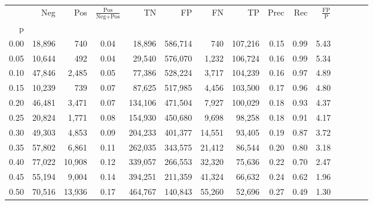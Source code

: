 \begin{tabular}{rrrcrrrrrrrrrrr}
\toprule
{} &     Neg &     Pos & $\frac{\text{Pos}}{\text{Neg}+\text{Pos}}$ &       TN &       FP &       FN &       TP &  Prec &   Rec & $\frac{\text{FP}}{\text{P}}$ \\
p    &         &         &                                            &          &          &          &          &       &       &                              \\
\midrule
0.00 &  18,896 &     740 &                                       0.04 &   18,896 &  586,714 &      740 &  107,216 &  0.15 &  0.99 &                         5.43 \\
0.05 &  10,644 &     492 &                                       0.04 &   29,540 &  576,070 &    1,232 &  106,724 &  0.16 &  0.99 &                         5.34 \\
0.10 &  47,846 &   2,485 &                                       0.05 &   77,386 &  528,224 &    3,717 &  104,239 &  0.16 &  0.97 &                         4.89 \\
0.15 &  10,239 &     739 &                                       0.07 &   87,625 &  517,985 &    4,456 &  103,500 &  0.17 &  0.96 &                         4.80 \\
0.20 &  46,481 &   3,471 &                                       0.07 &  134,106 &  471,504 &    7,927 &  100,029 &  0.18 &  0.93 &                         4.37 \\
0.25 &  20,824 &   1,771 &                                       0.08 &  154,930 &  450,680 &    9,698 &   98,258 &  0.18 &  0.91 &                         4.17 \\
0.30 &  49,303 &   4,853 &                                       0.09 &  204,233 &  401,377 &   14,551 &   93,405 &  0.19 &  0.87 &                         3.72 \\
0.35 &  57,802 &   6,861 &                                       0.11 &  262,035 &  343,575 &   21,412 &   86,544 &  0.20 &  0.80 &                         3.18 \\
0.40 &  77,022 &  10,908 &                                       0.12 &  339,057 &  266,553 &   32,320 &   75,636 &  0.22 &  0.70 &                         2.47 \\
0.45 &  55,194 &   9,004 &                                       0.14 &  394,251 &  211,359 &   41,324 &   66,632 &  0.24 &  0.62 &                         1.96 \\
0.50 &  70,516 &  13,936 &                                       0.17 &  464,767 &  140,843 &   55,260 &   52,696 &  0.27 &  0.49 &                         1.30 \\

\end{tabular}

